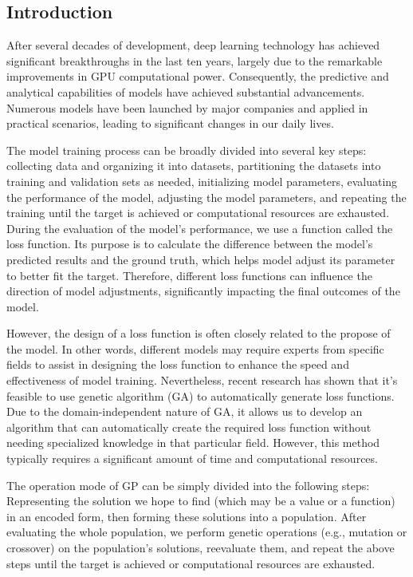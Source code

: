 \begin{ZhChapter}

\chapter{Introduction}

After several decades of development, deep learning \cite{deepLearning} technology has achieved significant breakthroughs in the last ten years, largely due to the remarkable improvements in GPU computational power. Consequently, the predictive and analytical capabilities of models have achieved substantial advancements. Numerous models have been launched by major companies and applied in practical scenarios, leading to significant changes in our daily lives.

The model training process can be broadly divided into several key steps: collecting data and organizing it into datasets, partitioning the datasets into training and validation sets as needed, initializing model parameters, evaluating the performance of the model, adjusting the model parameters, and repeating the training until the target is achieved or computational resources are exhausted. During the evaluation of the model's performance, we use a function called the loss function\cite{janocha2017lossfunctionsdeepneural}. Its purpose is to calculate the difference between the model's predicted results and the ground truth, which helps model adjust its parameter to better fit the target. Therefore, different loss functions can influence the direction of model adjustments, significantly impacting the final outcomes of the model.

However, the design of a loss function is often closely related to the propose of the model\cite{lossFunctionMakeDifference}. In other words, different models may require experts from specific fields to assist in designing the loss function to enhance the speed and effectiveness of model training. Nevertheless, recent research has shown that it’s feasible to use genetic algorithm (GA) \cite{geneticProgramming} to automatically generate loss functions. Due to the domain-independent nature of GA, it allows us to develop an algorithm that can automatically create the required loss function without needing specialized knowledge in that particular field. However, this method typically requires a significant amount of time and computational resources.

The operation mode of GP can be simply divided into the following steps: Representing the solution we hope to find (which may be a value or a function) in an encoded form, then forming these solutions into a population. After evaluating the whole population, we perform genetic operations (e.g., mutation or crossover) on the population's solutions, reevaluate them, and repeat the above steps until the target is achieved or computational resources are exhausted.


\end{ZhChapter}
